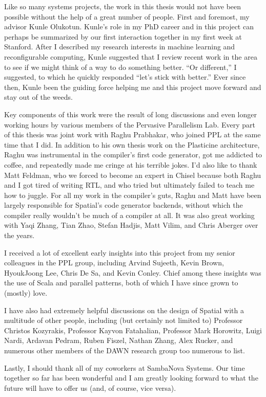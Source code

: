 Like so many systems projects, the work in this thesis would not have been
possible without the help of
a great number of people. First and foremost, my advisor Kunle Olukotun.
Kunle's role in my PhD career and in this project can perhaps be summarized by
our first interaction together in my first week at Stanford.
After I described my research interests in
machine learning and reconfigurable computing, Kunle suggested that I review recent
work in the area to see if we might think of a way to do something better.
``Or different,'' I suggested, to which he quickly responded ``let's stick
with better.''  Ever since then, Kunle been the guiding force helping me and this
project move forward and stay out of the weeds.

Key components of this work were the result of long discussions and even longer
working hours by various members of the Pervasive Parallelism Lab.
Every part of this thesis was joint work with Raghu Prabhakar, who joined PPL
at the same time that I did. In addition to his own thesis work on the Plasticine
architecture, Raghu was instrumental in the compiler's
first code generator, got me addicted to coffee,
and repeatedly made me cringe at his terrible jokes.
I'd also like to thank Matt Feldman, who we forced to become an expert in Chisel
because both Raghu and I got tired of writing RTL,
and who tried but ultimately failed to teach me how to juggle.
For all my work in the compiler's guts, Raghu and Matt have been largely
responsible for Spatial's code generator backends, without which the
compiler really wouldn't be much of a compiler at all.
It was also great working with Yaqi Zhang, Tian Zhao, Stefan Hadjis, Matt Vilim,
and Chris Aberger over the years.

I received a lot of excellent early insights into this project from my senior
colleagues in the PPL group, including Arvind Sujeeth, Kevin Brown, HyoukJoong
Lee, Chris De Sa, and Kevin Conley. Chief among these insights was the use of
Scala and parallel patterns, both of which I have since grown to (mostly) love.

I have also had extremely helpful discussions on the design of Spatial
with a multitude of other people, including (but certainly not limited to)
Professor Christos Kozyrakis, Professor Kayvon Fatahalian, Professor Mark Horowitz,
Luigi Nardi, Ardavan Pedram, Ruben Fiszel, Nathan Zhang, Alex Rucker, and
numerous other members of the DAWN research group too numerous to list.


Lastly, I should thank all of my coworkers at SambaNova Systems. Our time
together so far has been wonderful and I am greatly looking forward to what
the future will have to offer us (and, of course, vice versa).
